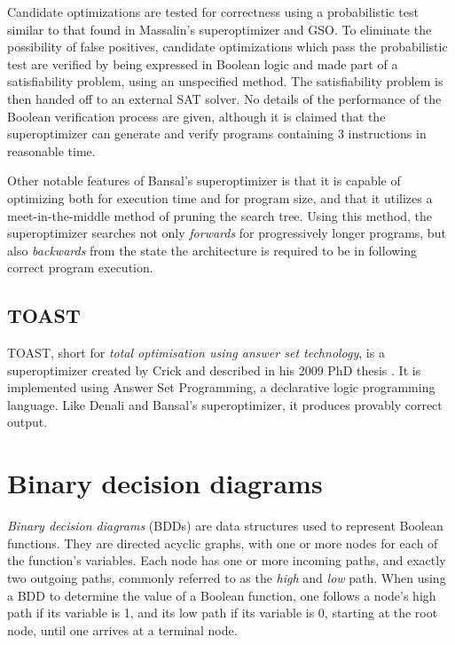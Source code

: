 \documentclass[a4paper,11pt]{kth-mag}
\begin{document}
Candidate optimizations are tested for correctness using a probabilistic test similar to that found in Massalin's superoptimizer and GSO.
To eliminate the possibility of false positives, candidate optimizations which pass the probabilistic test are verified by being expressed in Boolean logic and made part of a satisfiability problem, using an unspecified method.
The satisfiability problem is then handed off to an external SAT solver.
No details of the performance of the Boolean verification process are given, although it is claimed that the superoptimizer can generate and verify programs containing 3 instructions in reasonable time.

Other notable features of Bansal's superoptimizer is that it is capable of optimizing both for execution time and for program size, and that it utilizes a meet-in-the-middle method of pruning the search tree.
Using this method, the superoptimizer searches not only \emph{forwards} for progressively longer programs, but also \emph{backwards} from the state the architecture is required to be in following correct program execution.

\subsection{TOAST}

TOAST, short for \emph{total optimisation using answer set technology}, is a superoptimizer created by Crick and described in his 2009 PhD thesis \cite{crick_thesis}.
It is implemented using Answer Set Programming, a declarative logic programming language.
Like Denali and Bansal's superoptimizer, it produces provably correct output.

%

\section{Binary decision diagrams}
\label{s:bdds}

\emph{Binary decision diagrams} (BDDs) are data structures used to represent Boolean functions.
They are directed acyclic graphs, with one or more nodes for each of the function's variables.
Each node has one or more incoming paths, and exactly two outgoing paths, commonly referred to as the \emph{high} and \emph{low} path.
When using a BDD to determine the value of a Boolean function, one follows a node's high path if its variable is 1, and its low path if its variable is 0, starting at the root node, until one arrives at a terminal node.
\end{document}

